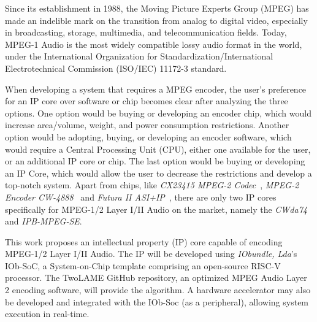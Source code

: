 

Since its establishment in 1988, the Moving Picture Experts Group (MPEG) has made an indelible mark on the transition from analog to digital video, especially in broadcasting, storage, multimedia, and telecommunication fields.
Today, MPEG-1 Audio is the most widely compatible lossy audio format in the world, under the International Organization for Standardization/International Electrotechnical Commission (ISO/IEC) 11172-3 standard.

When developing a system that requires a MPEG encoder, the user's preference for an IP core over software or chip becomes clear after analyzing the three options.
One option would be buying or developing an encoder chip, which would increase area/volume, weight, and power consumption restrictions. 
Another option would be adopting, buying, or developing an encoder software, which would require a Central Processing Unit (CPU), either one available for the user, or an additional IP core or chip. 
The last option would be buying or developing an IP Core, which would allow the user to decrease the restrictions and develop a top-notch system.
Apart from chips, like \textit{CX23415 MPEG-2 Codec}~\cite{cx23415}, \textit{MPEG-2 Encoder CW-4888}~\cite{cw4888} and \textit{Futura II ASI+IP}~\cite{futura}, there are only two IP cores specifically for MPEG-1/2 Layer I/II Audio on the market, namely the \textit{CWda74} and \textit{IPB-MPEG-SE}. 

This work proposes an intellectual property (IP) core capable of encoding MPEG-1/2 Layer I/II Audio. 
The IP will be developed using \textit{IObundle, Lda}'s IOb-SoC, a System-on-Chip template comprising an open-source RISC-V processor. The TwoLAME GitHub repository, an optimized MPEG Audio Layer 2 encoding software, will provide the algorithm.
A hardware accelerator may also be developed and integrated with the IOb-Soc (as a peripheral), allowing system execution in real-time.